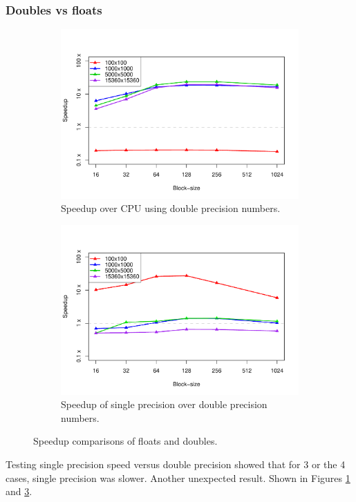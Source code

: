 \documentclass[12pt]{article}
\begin{document}
\subsubsection*{Doubles vs floats}
\begin{figure}
	\centering
	\begin{subfigure}{0.48\linewidth}
		\centering
		\includegraphics[width=0.85\linewidth]{../plots/tot_double.pdf}
		\caption{Speedup over CPU using double precision numbers.}
		\label{fig:12}
	\end{subfigure}\hfill
	\begin{subfigure}{0.48\linewidth}
		\centering
		\includegraphics[width=0.85\linewidth]{../plots/tot_doublevfloat.pdf}
		\caption{Speedup of single precision over double precision numbers.}
		\label{fig:13}
	\end{subfigure}
	\caption{Speedup comparisons of floats and doubles.}
\end{figure}
Testing single precision speed versus double precision showed that for 3 or the 4 cases, single precision was slower. Another unexpected result. Shown in Figures \ref{fig:12} and \ref{fig:13}.
\end{document}
